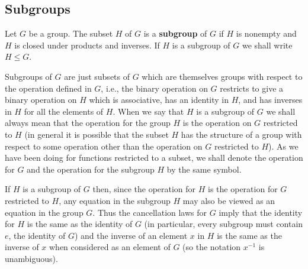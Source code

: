 \subsection{Subgroups}
\begin{definition}
Let $G$ be a group. The subset $H$ of $G$ is a \textbf{subgroup} of $G$ if $H$ is nonempty and $H$ is closed under products and inverses. If $H$ is a subgroup of $G$ we shall write $H\leq G$.
\end{definition}
Subgroups of $G$ are just subsets of $G$ which are themselves groups with respect to the operation defined in $G$, i.e., the binary operation on $G$ restricts to give a binary
operation on $H$ which is associative, has an identity in $H$, and has inverses in $H$ for all the elements of $H$.
When we say that $H$ is a subgroup of $G$ we shall always mean that the operation for the group $H$ is the operation on $G$ restricted to $H$ (in general it is possible that the subset $H$ has the structure of a group with respect to some operation other than the operation on $G$ restricted to $H$). As we have been doing for functions restricted to a subset, we shall denote the operation for $G$ and the operation for the subgroup $H$ by the same symbol.\par
If $H$ is a subgroup of $G$ then, since the operation for $H$ is the operation for $G$ restricted to $H$, any equation in the subgroup $H$ may also be viewed as an equation in the group $G$. Thus the cancellation laws for $G$ imply that the identity for $H$ is the same as the identity of $G$ (in particular, every subgroup must contain $e$, the identity of $G$) and the inverse of an element $x$ in $H$ is the same as the inverse of $x$ when considered as an element of $G$ (so the notation $x^{-1}$ is unambiguous).

